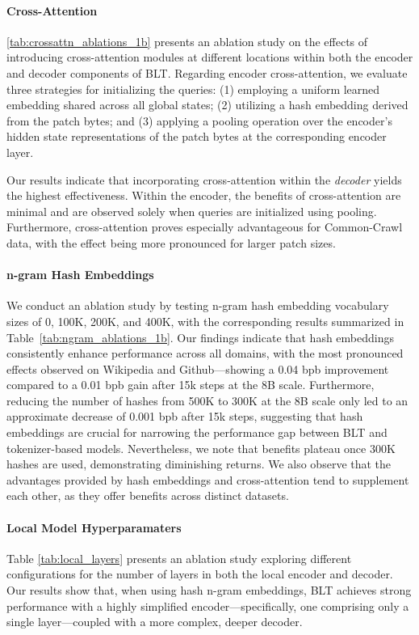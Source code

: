 \paragraph{Cross-Attention} 
\autoref{tab:crossattn_ablations_1b} presents an ablation study on the effects of introducing cross-attention modules at different locations within both the encoder and decoder components of {\textsc BLT}. Regarding encoder cross-attention, we evaluate three strategies for initializing the queries: (1) employing a uniform learned embedding shared across all global states; (2) utilizing a hash embedding derived from the patch bytes; and (3) applying a pooling operation over the encoder's hidden state representations of the patch bytes at the corresponding encoder layer.

Our results indicate that incorporating cross-attention within the \textit{decoder} yields the highest effectiveness. Within the encoder, the benefits of cross-attention are minimal and are observed solely when queries are initialized using pooling. Furthermore, cross-attention proves especially advantageous for Common-Crawl data, with the effect being more pronounced for larger patch sizes.

\paragraph{n-gram Hash Embeddings} 

We conduct an ablation study by testing n-gram hash embedding vocabulary sizes of 0, 100K, 200K, and 400K, with the corresponding results summarized in Table~\ref{tab:ngram_ablations_1b}. Our findings indicate that hash embeddings consistently enhance performance across all domains, with the most pronounced effects observed on Wikipedia and Github—showing a 0.04 bpb improvement compared to a 0.01 bpb gain after 15k steps at the 8B scale. Furthermore, reducing the number of hashes from 500K to 300K at the 8B scale only led to an approximate decrease of 0.001 bpb after 15k steps, suggesting that hash embeddings are crucial for narrowing the performance gap between {\textsc BLT} and tokenizer-based models. Nevertheless, we note that benefits plateau once 300K hashes are used, demonstrating diminishing returns. We also observe that the advantages provided by hash embeddings and cross-attention tend to supplement each other, as they offer benefits across distinct datasets.

\paragraph{Local Model Hyperparamaters} Table \ref{tab:local_layers} presents an ablation study exploring different configurations for the number of layers in both the local encoder and decoder. Our results show that, when using hash n-gram embeddings, {\textsc BLT} achieves strong performance with a highly simplified encoder—specifically, one comprising only a single layer—coupled with a more complex, deeper decoder.

